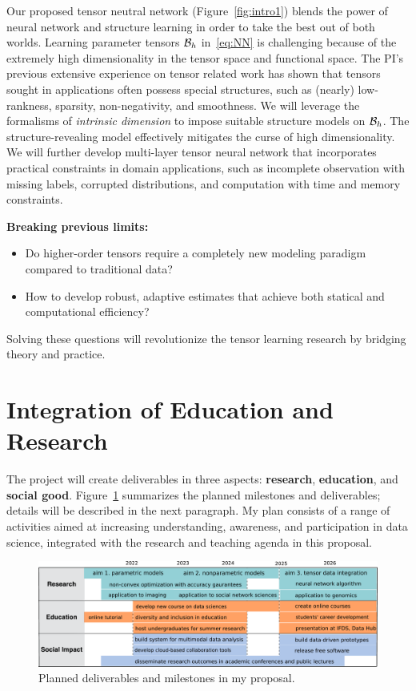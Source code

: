 \documentclass[11pt]{article}
\DeclareRobustCommand{\mybox}[2][gray!20]{%
\begin{tcolorbox}[   %
        breakable,
        left=0pt,
        right=0pt,
        top=0pt,
        bottom=0pt,
        colback=#1,
        colframe=#1,
        width=\dimexpr\textwidth\relax, 
        enlarge left by=0mm,
        boxsep=5pt,
        arc=0pt,outer arc=0pt,
        ]
        #2
\end{tcolorbox}}
\DeclareRobustCommand{\mybox}[2][gray!20]{%
\begin{tcolorbox}[   %
        breakable,
        left=0pt,
        right=0pt,
        top=0pt,
        bottom=0pt,
        colback=#1,
        colframe=#1,
        width=\dimexpr\textwidth\relax, 
        enlarge left by=0mm,
        boxsep=5pt,
        arc=0pt,outer arc=0pt,
        ]
        #2
\end{tcolorbox}
}
\theoremstyle{exampstyle}
\theoremstyle{definition}
\begin{document}
Our proposed tensor neutral network (Figure~\ref{fig:intro1}) blends the power of neural network and structure learning in order to take the best out of both worlds. Learning parameter tensors $\mathcal{B}_h$ in~\eqref{eq:NN} is challenging because of the extremely high dimensionality in the tensor space and functional space. The PI's previous extensive experience on tensor related work has shown that tensors sought in applications often possess special structures, such as (nearly) low-rankness, sparsity, non-negativity, and smoothness. We will leverage the formalisms of \emph{intrinsic dimension} to impose suitable structure models on $\mathcal{B}_h$. The structure-revealing model effectively mitigates the curse of high dimensionality. We will further develop multi-layer tensor neural network that incorporates practical constraints in domain applications, such as incomplete observation with missing labels, corrupted distributions, and computation with time and memory constraints.

\mybox[gray!20]{{\bf Breaking previous limits:} \hfill 
\begin{itemize}[wide]
\item Do higher-order tensors require a completely new modeling paradigm compared to traditional data? 
\item How to develop robust, adaptive estimates that achieve both statical and computational efficiency? 
\end{itemize}
Solving these questions will revolutionize the tensor learning research by bridging theory and practice.}



\vspace{-.3cm}
\section{Integration of Education and Research}\label{sec:impact}
\vspace{-.5cm}
The project will create deliverables in three aspects: {\bf research}, {\bf education}, and {\bf social good}. Figure~\ref{fig:proposal} summarizes the planned milestones and deliverables; details will be described in the next paragraph. My plan consists of a range of activities aimed at increasing understanding, awareness, and participation in data science, integrated with the research and teaching agenda in this proposal. 

\begin{figure}[!ht]
\begin{center}
\includegraphics[width=.98\textwidth]{milestone.pdf}
\caption{Planned deliverables and milestones in my proposal.}\label{fig:proposal}
\end{center}
\end{figure}
\end{document}
